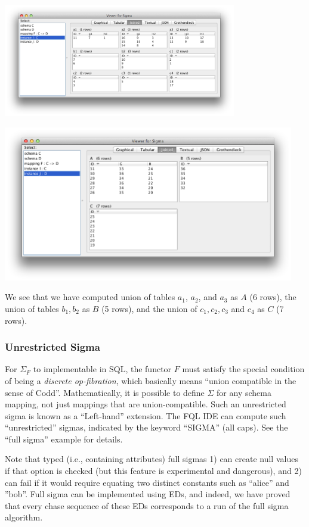 \documentclass[12pt]{article}
\begin{document}
\begin{center}
\includegraphics[width=4in]{sigmaI}

\includegraphics[width=5in]{sigmaJ}
\end{center}

We see that we have computed union of tables $a_1$, $a_2$, and $a_3$ as $A$ (6 rows), the union of tables $b_1, b_2$ as $B$ (5 rows), and the union of $c_1, c_2, c_3$ and $c_4$ as $C$ (7 rows). 

\subsubsection{Unrestricted Sigma}

For $\Sigma_F$ to implementable in SQL, the functor $F$ must satisfy the special condition of being a {\it discrete op-fibration}, which basically means ``union compatible in the sense of Codd''.  Mathematically, it is possible to define $\Sigma$ for any schema mapping, not just mappings that are union-compatible.  Such an unrestricted sigma is known as a ``Left-hand'' extension.  The FQL IDE can compute such ``unrestricted'' sigmas, indicated by the keyword ``SIGMA'' (all caps).  See the ``full sigma'' example for details.  

Note that typed (i.e., containing attributes) full sigmas 1) can create null values if that option is checked (but this feature is experimental and dangerous), and 2) can fail if it would require equating two distinct constants such as ``alice'' and ''bob''.  Full sigma can be implemented using EDs, and indeed, we have proved that every chase sequence of these EDs corresponds to a run of the full sigma algorithm.  
\end{document}
